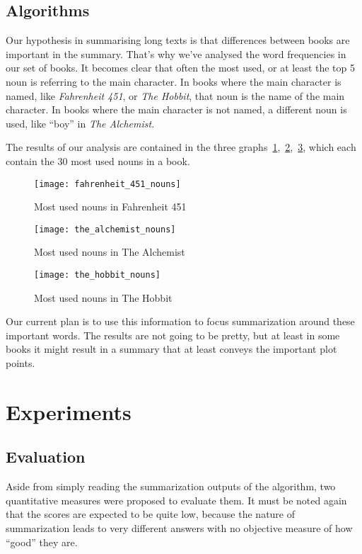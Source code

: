 \subsection{Algorithms}

Our hypothesis in summarising long texts is that differences between books are
important in the summary. That's why we've analysed the word frequencies in our
set of books. It becomes clear that often the most used, or at least the top 5
noun is referring to the main character. In books where the main character is
named, like \textit{Fahrenheit 451}, or \textit{The Hobbit}, that noun is the
name of the main character. In books where the main character is not named, a
different noun is used, like ``boy'' in \textit{The Alchemist}.

The results of our analysis are contained in the three
graphs~\ref{fig:fahrenheit_451_nouns},~\ref{fig:the_alchemist_nouns},~\ref{fig:the_hobbit_nouns},
which each contain the 30 most used nouns in a book.

\begin{figure}[H]
	\centering
	\texttt{[image: fahrenheit\_451\_nouns]}
	\caption{Most used nouns in Fahrenheit 451}\label{fig:fahrenheit_451_nouns}
\end{figure}

\begin{figure}[H]
	\centering
	\texttt{[image: the\_alchemist\_nouns]}
	\caption{Most used nouns in The Alchemist}\label{fig:the_alchemist_nouns}
\end{figure}

\begin{figure}[H]
	\centering
	\texttt{[image: the\_hobbit\_nouns]}
	\caption{Most used nouns in The Hobbit}\label{fig:the_hobbit_nouns}
\end{figure}

Our current plan is to use this information to focus summarization around these
important words. The results are not going to be pretty, but at least in some
books it might result in a summary that at least conveys the important plot
points.

\section{Experiments}

\subsection{Evaluation}
Aside from simply reading the summarization outputs of the algorithm, two
quantitative measures were proposed to evaluate them. It must be noted again
that the scores are expected to be quite low, because the nature of
summarization leads to very different answers with no objective measure of how
``good'' they are. 

